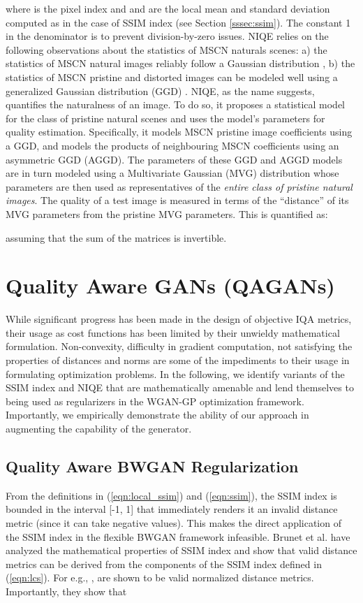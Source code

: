 \documentclass{article}
\begin{document}
where  is the pixel index and  and  are the local mean and standard deviation computed as in the case of SSIM index (see Section \ref{sssec:ssim}). The constant 1 in the denominator is to prevent division-by-zero issues.
NIQE relies on the following observations about the statistics of MSCN naturals scenes: a) the statistics of MSCN natural images reliably follow a Gaussian distribution \cite{ruderman1994statistics}, b) the statistics of MSCN pristine and distorted images can be modeled well using a generalized Gaussian distribution (GGD) \cite{moorthy2010statistics}. 
NIQE, as the name suggests, quantifies the naturalness of an image. To do so, it proposes a statistical model for the class of pristine natural scenes and uses the model's parameters for quality estimation. Specifically, it models MSCN pristine image coefficients using a GGD, and models the products of neighbouring MSCN coefficients using an asymmetric GGD (AGGD). The parameters of these GGD and AGGD models are in turn modeled using a Multivariate Gaussian (MVG) distribution whose parameters  are then used as representatives of the {\em{entire class of pristine natural images}}. The quality of a test image is measured in terms of the ``distance'' of its MVG parameters  from the pristine MVG parameters. This is quantified as:

assuming that the sum of the matrices is invertible.
\section{Quality Aware GANs (QAGANs)}
While significant progress has been made in the design of objective IQA metrics, their usage as cost functions has been limited by their unwieldy mathematical formulation. Non-convexity, difficulty in gradient computation, not satisfying the properties of distances and norms are some of the impediments to their usage in formulating optimization problems. In the following, we identify variants of the SSIM index and NIQE that are mathematically amenable and lend themselves to being used as regularizers in the WGAN-GP optimization framework. Importantly, we empirically demonstrate the ability of our approach in augmenting the capability of the generator. 
\subsection{Quality Aware BWGAN Regularization}
From the definitions in (\ref{eqn:local_ssim}) and (\ref{eqn:ssim}), the SSIM index is bounded in the interval [-1, 1] that immediately renders it an invalid distance metric (since it can take negative values). This makes the direct application of the SSIM index in the flexible BWGAN framework infeasible. Brunet et al. \cite{brunet2011mathematical} have analyzed the mathematical properties of SSIM index and show that valid distance metrics can be derived from the components of the SSIM index defined in (\ref{eqn:lcs}). For e.g., ,  are shown to be valid normalized distance metrics. Importantly, they show that 
\end{document}
